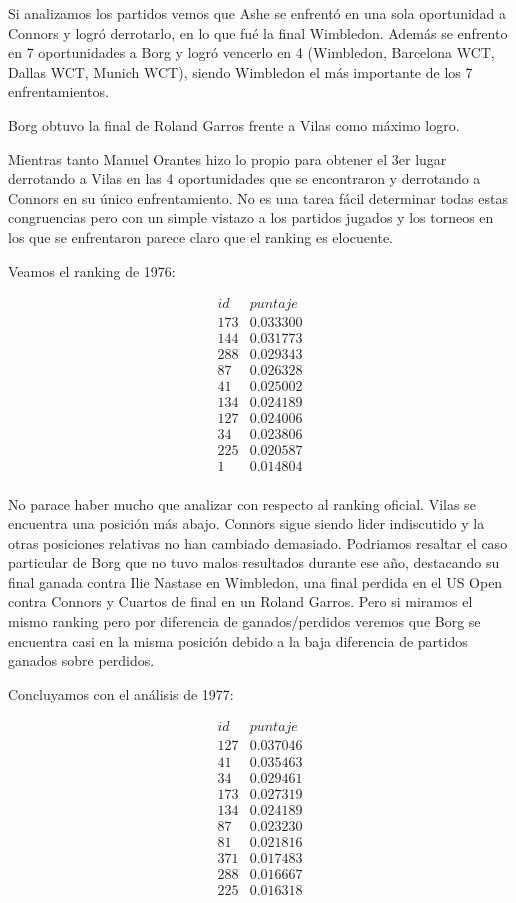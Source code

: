 Si analizamos los partidos vemos que Ashe se enfrentó en una sola oportunidad a Connors y logró derrotarlo, en lo que fué la final Wimbledon. Además se enfrento en 7 oportunidades a Borg y logró vencerlo en 4 (Wimbledon, Barcelona WCT, Dallas WCT, Munich WCT), siendo Wimbledon el más importante de los 7 enfrentamientos.

Borg obtuvo la final de Roland Garros frente a Vilas como máximo logro. 

Mientras tanto Manuel Orantes hizo lo propio para obtener el 3er lugar derrotando a Vilas en las 4 oportunidades que se encontraron y derrotando a Connors en su único enfrentamiento. 
No es una tarea fácil determinar todas estas congruencias pero con un simple vistazo a los partidos jugados y los torneos en los que se enfrentaron parece claro que el ranking es elocuente.

Veamos el ranking de 1976:

\begin{eqnarray*}
id & puntaje \\
173 & 0.033300 \\
144 & 0.031773 \\
288 & 0.029343 \\
87 & 0.026328 \\
41 & 0.025002 \\
134 & 0.024189 \\
127 & 0.024006 \\
34 & 0.023806 \\
225 & 0.020587 \\
1 & 0.014804 \\
\end{eqnarray*}

No parace haber mucho que analizar con respecto al ranking oficial. Vilas se encuentra una posición más abajo. Connors sigue siendo lider indiscutido y la otras posiciones relativas no han cambiado demasiado. Podriamos resaltar el caso particular de Borg que no tuvo malos resultados durante ese año, destacando su final ganada contra Ilie Nastase en Wimbledon, una final perdida en el US Open contra Connors y Cuartos de final en un Roland Garros. Pero si miramos el mismo ranking pero por diferencia de ganados/perdidos veremos que Borg se encuentra casi en la misma posición debido a la baja diferencia de partidos ganados sobre perdidos.


Concluyamos con el análisis de 1977: 

\begin{eqnarray*}
id & puntaje \\
127 & 0.037046 \\
41 & 0.035463 \\
34 & 0.029461 \\
173 & 0.027319 \\
134 & 0.024189 \\
87 & 0.023230 \\
81 & 0.021816 \\
371 & 0.017483 \\
288 & 0.016667 \\
225 & 0.016318 \\
\end{eqnarray*}

